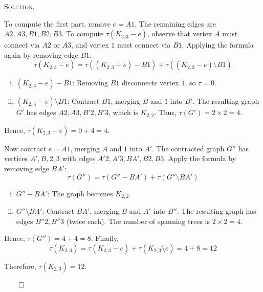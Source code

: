 \documentclass[12pt, a4paper, oneside]{ctexart}
\newenvironment{solution}{%
	\par\noindent\textsc{Solution. }\ignorespaces
}{%
	\hfill$\qed$\par
}
\begin{document}
\begin{solution}
\begin{enumerate}
           To compute the first part, remove \( e = A1 \). The remaining edges are \( A2, A3, B1, B2, B3 \). To compute \( \tau(K_{2,3} - e) \), observe that vertex \( A \) must connect via \( A2 \) or \( A3 \), and vertex \( 1 \) must connect via \( B1 \). Applying the formula again by removing edge \( B1 \):
            \[
            \tau(K_{2,3} - e) = \tau((K_{2,3} - e) - B1) + \tau((K_{2,3} - e) \setminus B1)
            \]
            \begin{enumerate}[(i)]
                \item \( (K_{2,3} - e) - B1 \): Removing \( B1 \) disconnects vertex \( 1 \), so \( \tau = 0 \).
                \item \( (K_{2,3} - e) \setminus B1 \): Contract \( B1 \), merging \( B \) and \( 1 \) into \( B' \). The resulting graph \( G' \) has edges \( A2, A3, B'2, B'3 \), which is \( K_{2,2} \). Thus, \( \tau(G') = 2 \times 2 = 4 \).
            \end{enumerate}
            Hence, \( \tau(K_{2,3} - e) = 0 + 4 = 4 \).
            
            Now contract \( e = A1 \), merging \( A \) and \( 1 \) into \( A' \). The contracted graph \( G'' \) has vertices \( A', B, 2, 3 \) with edges \( A'2, A'3, BA', B2, B3 \). Apply the formula by removing edge \( BA' \):
            \[
            \tau(G'') = \tau(G'' - BA') + \tau(G'' \setminus BA')
            \]
            \begin{enumerate}[(i)]
                \item \( G'' - BA' \): The graph becomes $K_{2,2}$.
                \item \( G'' \setminus BA' \): Contract \( BA' \), merging \( B \) and \( A' \) into \( B'' \). The resulting graph has edges \( B''2, B''3 \) (twice each). The number of spanning trees is \( 2 \times 2 = 4 \).
            \end{enumerate}
            Hence, \( \tau(G'') = 4 + 4 = 8 \). Finally,
            \[
            \tau(K_{2,3}) = \tau(K_{2,3} - e) + \tau(K_{2,3} \setminus e) = 4 + 8 = 12
            \]
            
            Therefore, \( \tau(K_{2,3}) = 12 \).
        \end{enumerate}
		
	\end{solution}
	
	
	
\end{document}
